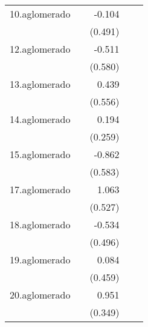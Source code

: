 {\begin{longtable}{l*{4}{D{.}{.}{-1}}}
\addlinespace
10.aglomerado&                     &      -0.104         &                     &                     \\
            &                     &     (0.491)         &                     &                     \\
\addlinespace
12.aglomerado&                     &      -0.511         &                     &                     \\
            &                     &     (0.580)         &                     &                     \\
\addlinespace
13.aglomerado&                     &       0.439         &                     &                     \\
            &                     &     (0.556)         &                     &                     \\
\addlinespace
14.aglomerado&                     &       0.194         &                     &                     \\
            &                     &     (0.259)         &                     &                     \\
\addlinespace
15.aglomerado&                     &      -0.862         &                     &                     \\
            &                     &     (0.583)         &                     &                     \\
\addlinespace
17.aglomerado&                     &       1.063\sym{*}  &                     &                     \\
            &                     &     (0.527)         &                     &                     \\
\addlinespace
18.aglomerado&                     &      -0.534         &                     &                     \\
            &                     &     (0.496)         &                     &                     \\
\addlinespace
19.aglomerado&                     &       0.084         &                     &                     \\
            &                     &     (0.459)         &                     &                     \\
\addlinespace
20.aglomerado&                     &       0.951\sym{**} &                     &                     \\
            &                     &     (0.349)         &                     &                     \\

\end{longtable}}
